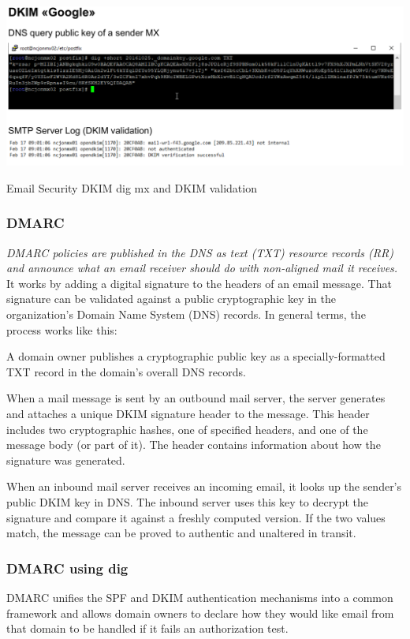 \begin{table}[h]
  \centering
  \includegraphics[width=\textwidth]{resources/12-email-security-dkim-5.png}
  \caption{Email Security DKIM dig mx and DKIM validation}
\end{table}


\subsubsection{DMARC}
\textit{DMARC policies are published in the DNS as text (TXT) resource records (RR) and announce what an email receiver should do with non-aligned mail it receives.}
It works by adding a digital signature to the headers of an email message. That signature can be
validated against a public cryptographic key in the organization's Domain Name System (DNS) records. In general terms, the process works like this:

A domain owner publishes a cryptographic public key as a specially-formatted TXT record in the domain's overall DNS records.

When a mail message is sent by an outbound mail server, the server generates and attaches a unique DKIM signature header to the message. This header includes two cryptographic hashes, one of specified headers, and one of the message body (or part of it). The header contains information about how the signature was generated.

When an inbound mail server receives an incoming email, it looks up the sender's public DKIM key in DNS. The inbound server uses this key to decrypt the signature and compare it against a freshly computed version. If the two values match, the message can be proved to authentic and unaltered in transit.


\subsubsection*{DMARC using dig}
DMARC unifies the SPF and DKIM authentication mechanisms into a common framework and allows domain owners to declare how they would like email from that domain to be handled if it fails an authorization test.

